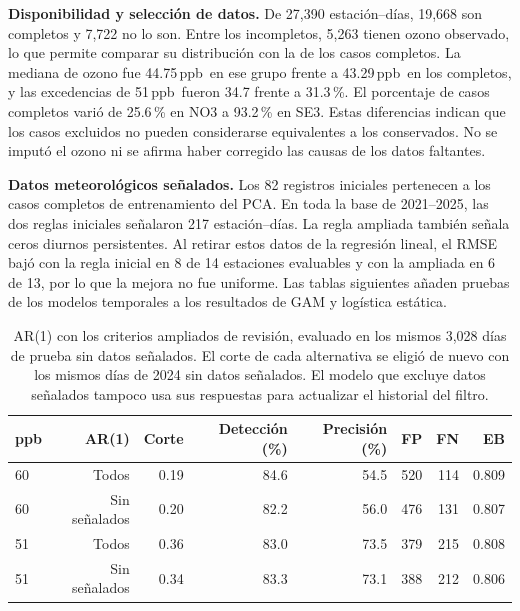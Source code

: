 \documentclass[11pt,letterpaper]{article}
\newcommand{\ppb}{\,ppb}
\newenvironment{cambio}{}{}
\begin{document}
\begin{cambio}
\textbf{Disponibilidad y selección de datos.} De 27,390 estación--días, 19,668 son completos y 7,722 no lo son. Entre los incompletos, 5,263 tienen ozono observado, lo que permite comparar su distribución con la de los casos completos. La mediana de ozono fue 44.75\ppb\ en ese grupo frente a 43.29\ppb\ en los completos, y las excedencias de 51\ppb\ fueron 34.7 frente a 31.3\,\%. El porcentaje de casos completos varió de 25.6\,\% en NO3 a 93.2\,\% en SE3. Estas diferencias indican que los casos excluidos no pueden considerarse equivalentes a los conservados. No se imputó el ozono ni se afirma haber corregido las causas de los datos faltantes.

\textbf{Datos meteorológicos señalados.} Los 82 registros iniciales pertenecen a los casos completos de entrenamiento del PCA. En toda la base de 2021--2025, las dos reglas iniciales señalaron 217 estación--días. La regla ampliada también señala ceros diurnos persistentes. Al retirar estos datos de la regresión lineal, el RMSE bajó con la regla inicial en 8 de 14 estaciones evaluables y con la ampliada en 6 de 13, por lo que la mejora no fue uniforme. Las tablas siguientes añaden pruebas de los modelos temporales a los resultados de GAM y logística estática.
\end{cambio}
\begin{table}[H]
\begin{cambio}\centering\small
\begin{tabular}{@{}lrrrrrrr@{}}\toprule
ppb & AR(1) & Corte & Detección (\%) & Precisión (\%) & FP & FN & EB\\\midrule
60 & Todos & 0.19 & 84.6 & 54.5 & 520 & 114 & 0.809\\
60 & Sin señalados & 0.20 & 82.2 & 56.0 & 476 & 131 & 0.807\\
51 & Todos & 0.36 & 83.0 & 73.5 & 379 & 215 & 0.808\\
51 & Sin señalados & 0.34 & 83.3 & 73.1 & 388 & 212 & 0.806\\
\bottomrule\end{tabular}
\caption{AR(1) con los criterios ampliados de revisión, evaluado en los mismos 3,028 días de prueba sin datos señalados. El corte de cada alternativa se eligió de nuevo con los mismos días de 2024 sin datos señalados. El modelo que excluye datos señalados tampoco usa sus respuestas para actualizar el historial del filtro.}\label{tab:ar1_calidad}
\end{cambio}
\end{table}
\end{document}
